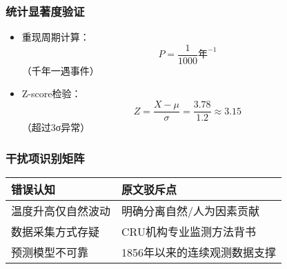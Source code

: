 \documentclass{article}
\begin{document}
\subsubsection*{统计显著度验证}
\begin{itemize}
    \item 重现周期计算：\[ P = \frac{1}{1000} \text{年}^{-1} \]（千年一遇事件）
    \item Z-score检验：\[ Z = \frac{X - \mu}{\sigma} = \frac{3.78}{1.2} \approx 3.15 \]（超过3σ异常）
\end{itemize}

\subsubsection*{干扰项识别矩阵}
\begin{tabular}{|l|l|}
\hline
\textbf{错误认知} & \textbf{原文驳斥点} \\
\hline
温度升高仅自然波动 & 明确分离自然/人为因素贡献 \\
数据采集方式存疑 & CRU机构专业监测方法背书 \\
预测模型不可靠 & 1856年以来的连续观测数据支撑 \\
\hline
\end{tabular}
\end{document}
